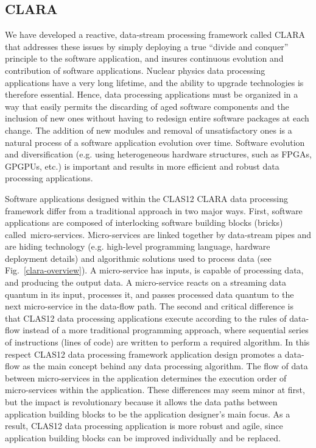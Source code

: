 \documentclass{elsart}
\begin{document}
\subsection{CLARA}

We have developed a reactive, data-stream processing framework called CLARA
\cite{clara-2011,clara-service,framework,clara-2016} that addresses these issues by simply deploying a true
“divide and conquer” principle to the software application, and insures continuous evolution and contribution of
software applications. Nuclear physics data processing applications have a very long lifetime, and the ability to
upgrade technologies is therefore essential. Hence, data processing applications must be organized in a way 
that easily permits the discarding of aged software components and the inclusion of new ones without having to
redesign entire software packages at each change. The addition of new modules and removal of unsatisfactory
ones is a natural process of a software application evolution over time.  Software evolution and diversification
(e.g. using heterogeneous hardware structures, such as FPGAs, GPGPUs, etc.) is important and results in more
efficient and robust data processing applications.

Software applications designed within the CLAS12 CLARA data processing framework differ from a traditional
approach in two major ways. First, software applications are composed of interlocking software building blocks
(bricks) called micro-services. Micro-services are linked together by data-stream pipes and are hiding technology
(e.g. high-level programming language, hardware deployment details) and algorithmic solutions used to process
data (see Fig.~\ref{clara-overview}). A micro-service has inputs, is capable of processing data, and producing the
output data. A micro-service reacts on a streaming data quantum in its input, processes it, and passes processed
data quantum to the next micro-service in the data-flow path. The second and critical difference is that CLAS12
data processing applications execute according to the rules of data-flow instead of a more traditional programming
approach, where sequential series of instructions (lines of code) are written to perform a required algorithm. In
this respect CLAS12 data processing framework application design promotes a data-flow as the main concept
behind any data processing algorithm.   The flow of data between micro-services in the application determines
the execution order of micro-services within the application. These differences may seem minor at first, but
the impact is revolutionary because it allows the data paths between application building blocks to be the
application designer’s main focus. As a result, CLAS12 data processing application is more robust and agile, since
application building blocks can be improved individually and be replaced.
\end{document}
